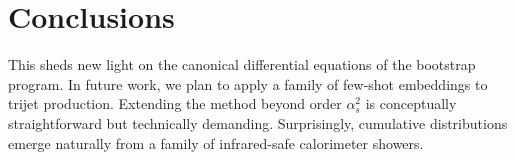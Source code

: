 \section{Conclusions}\label{sec:conclusions}

This sheds new light on the canonical differential equations of the
bootstrap program. In future work, we plan to apply a family of few-shot
embeddings to trijet production. Extending the method beyond order
$\alpha_s^2$ is conceptually straightforward but technically demanding.
Surprisingly, cumulative distributions emerge naturally from a family of
infrared-safe calorimeter showers.

